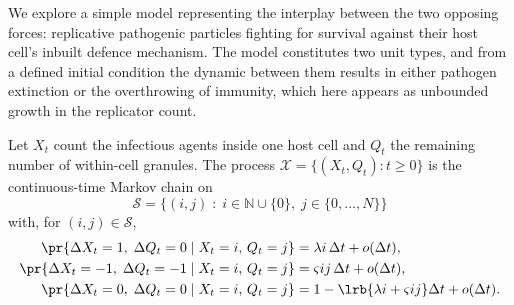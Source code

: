 We explore a simple model representing the interplay between the two
opposing forces: replicative pathogenic particles fighting for survival
against their host cell's inbuilt defence mechanism. The model constitutes
two unit types, and from a defined initial condition the dynamic between
them results in either pathogen extinction or the overthrowing of immunity,
which here appears as unbounded growth in the replicator count.

\begin{definition}
\label{path:def:rs}
Let $X_t$ count the infectious agents inside one host cell and $Q_t$ the
remaining number of within-cell granules. The process
$\mathcal{X}=\{(X_t,Q_t):t\ge0\}$ is the continuous-time Markov chain on
\begin{equation}
\mathcal{S}=\bigl\{(i,j)\;:\;i\in\mathbb{N}\cup\{0\},\;j\in\{0,\dots,N\}\bigr\}
\label{path:eq:statespace}
\end{equation}
with, for $(i,j)\in\mathcal{S}$,
\begin{equation}
\begin{aligned}
\pr{\Delta X_t=1,\;\Delta Q_t=0 \mid X_t=i,\,Q_t=j}
  &= \lambda i\,\Delta t+o(\Delta t),\\
\pr{\Delta X_t=-1,\;\Delta Q_t=-1 \mid X_t=i,\,Q_t=j}
  &= \varsigma ij\,\Delta t+o(\Delta t),\\
\pr{\Delta X_t=0,\;\Delta Q_t=0 \mid X_t=i,\,Q_t=j}
  &= 1-\lrb{\lambda i+\varsigma ij}\Delta t+o(\Delta t).
\end{aligned}
\label{path:eq:rsrates}
\end{equation}
\end{definition}

